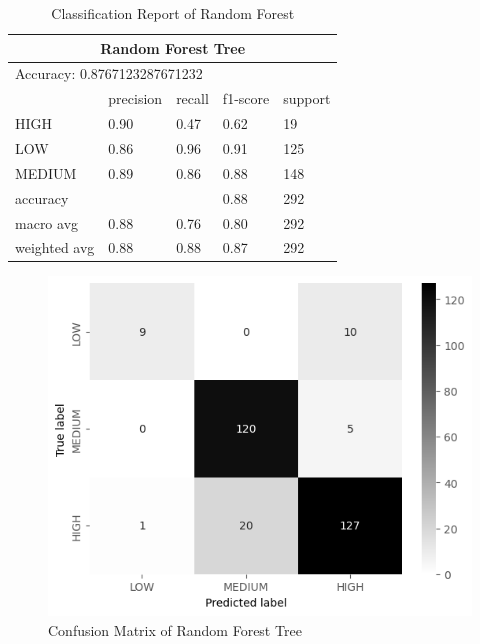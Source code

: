 \begin{table}[H]  \centering  
    \begin{tabular}{@{}lllll@{}}
    \toprule
    \multicolumn{5}{c}{Random Forest Tree}                 \\ \midrule
    \multicolumn{5}{l}{Accuracy: 0.8767123287671232}       \\\midrule
                 & precision & recall & f1-score & support \\
    HIGH         & 0.90      & 0.47   & 0.62     & 19      \\ 
    LOW          & 0.86      & 0.96   & 0.91     & 125     \\
    MEDIUM       & 0.89      & 0.86   & 0.88     & 148     \\
    accuracy     &           &        & 0.88     & 292     \\
    macro avg    & 0.88      & 0.76   & 0.80     & 292     \\
    weighted avg & 0.88      & 0.88   & 0.87     & 292     \\ \bottomrule
    \end{tabular}
    \caption{Classification Report of Random Forest}
    \label{tableRFT}
\end{table}


\begin{figure}[H]
    \includegraphics[scale=0.7]{imgs/rft_cm}
    \centering
    \caption{Confusion Matrix of Random Forest Tree}
    \label{cmRFT}
\end{figure}


